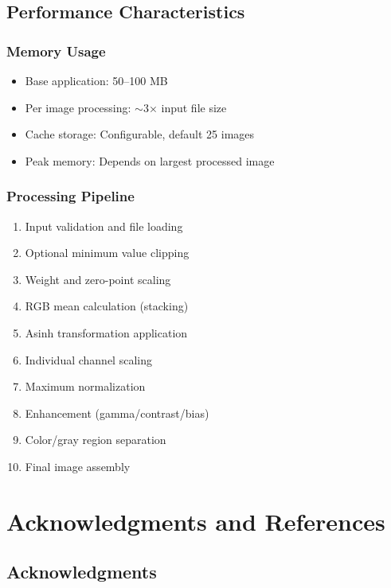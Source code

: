 \documentclass[11pt,a4paper]{article}
\begin{document}
\subsection{Performance Characteristics}

\subsubsection{Memory Usage}

\begin{itemize}[leftmargin=*]
\item Base application: 50--100 MB
\item Per image processing: $\sim$3× input file size
\item Cache storage: Configurable, default 25 images
\item Peak memory: Depends on largest processed image
\end{itemize}

\subsubsection{Processing Pipeline}

\begin{enumerate}
\item Input validation and file loading
\item Optional minimum value clipping
\item Weight and zero-point scaling
\item RGB mean calculation (stacking)
\item Asinh transformation application
\item Individual channel scaling
\item Maximum normalization
\item Enhancement (gamma/contrast/bias)
\item Color/gray region separation
\item Final image assembly
\end{enumerate}

\section{Acknowledgments and References}

\subsection{Acknowledgments}
\end{document}
